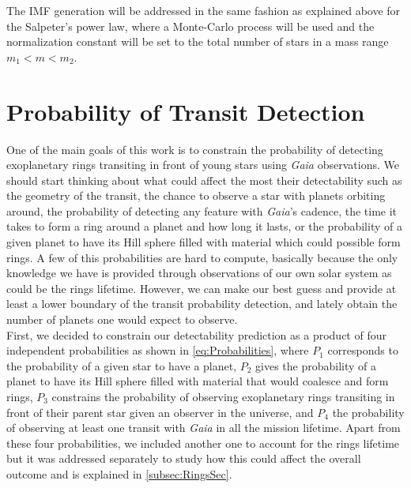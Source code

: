 The IMF generation will be addressed in the same fashion as explained above for the Salpeter's power law, where a Monte-Carlo process will be used and the normalization constant will be set to the total number of stars in a mass range $m_1 < m < m_2$. 

\section{Probability of Transit Detection} \label{sec:DetectionProbability}


One of the main goals of this work is to constrain the probability of detecting exoplanetary rings transiting in front of young stars using \textit{Gaia} observations. We should start thinking about what could affect the most their detectability such as the geometry of the transit, the chance to observe a star with planets orbiting around, the probability of detecting any feature with \textit{Gaia}'s cadence, the time it takes to form a ring around a planet and how long it lasts, or the probability of a given planet to have its Hill sphere filled with material which could possible form rings. A few of this probabilities are hard to compute, basically because the only knowledge we have is provided through observations of our own solar system as could be the rings lifetime. However, we can make our best guess and provide at least a lower boundary of the transit probability detection, and lately obtain the number of planets one would expect to observe.\\

First, we decided to constrain our detectability prediction as a product of four independent probabilities  as shown in \autoref{eq:Probabilities}, where $P_1$ corresponds to the probability of a given star to have a planet, $P_2$ gives the probability of a planet to have its Hill sphere filled with material that would coalesce and form rings, $P_3$ constrains the probability of observing exoplanetary rings transiting in front of their parent star given an observer in the universe, and $P_4$ the probability of observing at least one transit with \textit{Gaia} in all the mission lifetime. Apart from these four probabilities, we included another one to account for the rings lifetime but it was addressed separately to study how this could affect the overall outcome and is explained in \autoref{subsec:RingsSec}.\\

